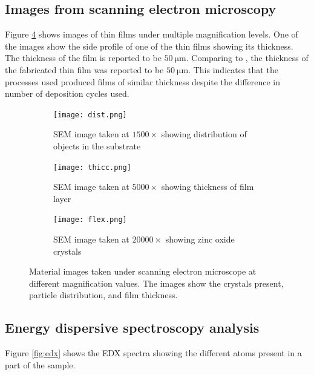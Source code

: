 \subsection{Images from scanning electron microscopy}

Figure \ref{fig:sem} shows images of thin films under multiple magnification levels.
One of the images show the side profile of one of the thin films showing its thickness.
The thickness of the film is reported to be $\SI{50}{\micro\meter}$.
Comparing to , the thickness of the fabricated thin film was reported to be $\SI{50}{\micro\meter}$.
This indicates that the processes used produced films of similar thickness despite the difference in number of deposition cycles used.

\begin{figure}
  \centering
  \begin{subfigure}{.5\textwidth}
    \centering
    \texttt{[image: dist.png]}
    \caption{SEM image taken at $1500\times$ showing distribution of objects in the substrate}
    \label{fig:dist}
  \end{subfigure}
  \begin{subfigure}{.5\textwidth}
    \centering
    \texttt{[image: thicc.png]}
    \caption{SEM image taken at $5000\times$ showing thickness of film layer}
    \label{fig:thicc}
  \end{subfigure}
  \begin{subfigure}{.5\textwidth}
    \centering
    \texttt{[image: flex.png]}
    \caption{SEM image taken at $20000\times$ showing zinc oxide crystals}
    \label{fig:flex}
  \end{subfigure}
  \caption[Material images under SEM]{Material images taken under scanning electron microscope at different magnification values. The images show the crystals present, particle distribution, and film thickness.}
  \label{fig:sem}
\end{figure}

\subsection{Energy dispersive spectroscopy analysis}

Figure \ref{fig:edx} shows the EDX spectra showing the different atoms present in a part of the sample.

